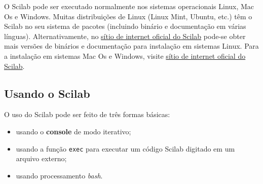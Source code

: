 O Scilab pode ser executado normalmente nos sistemas operacionais Linux, Mac Os e Windows. Muitas distribuições de Linux (Linux Mint, Ubuntu, etc.) têm o Scilab no seu sistema de pacotes (incluindo binário e documentação em várias línguas). Alternativamente, no \href{www.scilab.org}{sítio de internet oficial do Scilab} pode-se obter mais versões de binários e documentação para instalação em sistemas Linux. Para a instalação em sistemas Mac Os e Windows, visite \href{www.scilab.org}{sítio de internet oficial do Scilab}.

\subsection{Usando o Scilab}

O uso do Scilab pode ser feito de três formas básicas:
\begin{itemize}
\item usando o {\bf console} de modo iterativo;
\item usando a função \verb+exec+ para executar um código Scilab digitado em um arquivo externo;
\item usando processamento {\it bash}.
\end{itemize}


